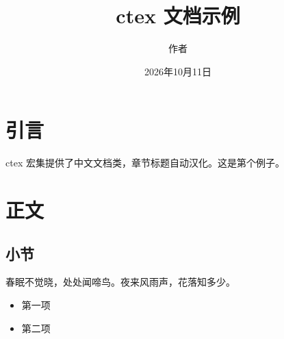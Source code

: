 \documentclass[UTF8]{ctexart}
\title{ctex 文档示例}
\author{作者}
\date{2026年10月11日}
\begin{document}
\maketitle
\tableofcontents
\section{引言}
ctex 宏集提供了中文文档类，章节标题自动汉化。这是第个例子。
\section{正文}
\subsection{小节}
春眠不觉晓，处处闻啼鸟。夜来风雨声，花落知多少。
\begin{itemize}
\item 第一项
\item 第二项
\end{itemize}
\end{document}
